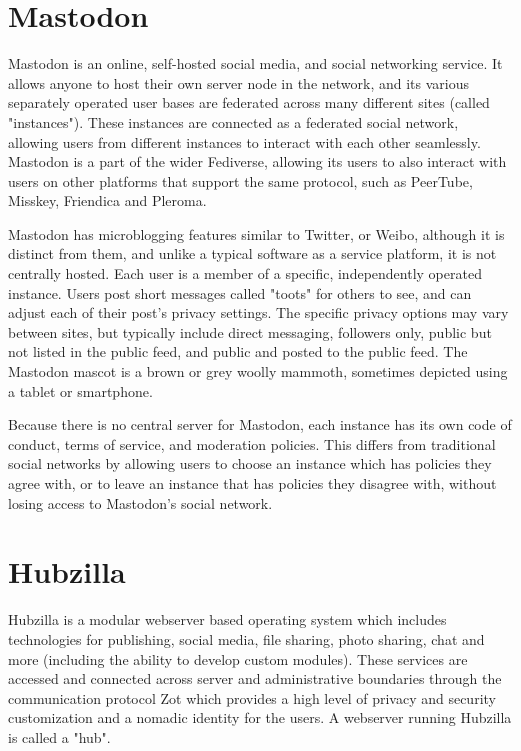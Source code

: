\section{Mastodon}

Mastodon is an online, self-hosted social media, and social networking service. It allows anyone to host their own server node in the network, and its various separately operated user bases are federated across many different sites (called "instances"). These instances are connected as a federated social network, allowing users from different instances to interact with each other seamlessly. Mastodon is a part of the wider Fediverse, allowing its users to also interact with users on other platforms that support the same protocol, such as PeerTube, Misskey, Friendica and Pleroma.

Mastodon has microblogging features similar to Twitter, or Weibo, although it is distinct from them, and unlike a typical software as a service platform, it is not centrally hosted. Each user is a member of a specific, independently operated instance. Users post short messages called "toots" for others to see, and can adjust each of their post's privacy settings. The specific privacy options may vary between sites, but typically include direct messaging, followers only, public but not listed in the public feed, and public and posted to the public feed. The Mastodon mascot is a brown or grey woolly mammoth, sometimes depicted using a tablet or smartphone.

Because there is no central server for Mastodon, each instance has its own code of conduct, terms of service, and moderation policies. This differs from traditional social networks by allowing users to choose an instance which has policies they agree with, or to leave an instance that has policies they disagree with, without losing access to Mastodon's social network.

\section{Hubzilla}

Hubzilla is a modular webserver based operating system which includes technologies for publishing, social media, file sharing, photo sharing, chat and more (including the ability to develop custom modules). These services are accessed and connected across server and administrative boundaries through the communication protocol Zot which provides a high level of privacy and security customization and a nomadic identity for the users. A webserver running Hubzilla is called a "hub".

